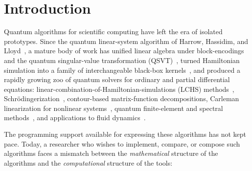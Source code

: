 \section{Introduction}
\label{sec:introduction}

Quantum algorithms for scientific computing have left the era of isolated
prototypes.  Since the quantum linear-system algorithm of Harrow, Hassidim,
and Lloyd~\cite{harrow2009hhl}, a mature body of work has unified linear
algebra under block-encodings and the quantum singular-value transformation
(QSVT)~\cite{gilyen2019qsvt,low2017qsp,martyn2021grand}, turned
Hamiltonian simulation into a family of interchangeable black-box
kernels~\cite{berry2015taylor,childs2021trotter,low2019qubitization}, and
produced a rapidly growing zoo of quantum solvers for ordinary and partial
differential equations: linear-combination-of-Hamiltonian-simulations (LCHS)
methods~\cite{an2026lchs}, Schr\"odingerization~\cite{jin2024schrodingerization},
contour-based matrix-function decompositions, Carleman
linearization for nonlinear systems~\cite{leyton2008ode,berry2014ode,liu2021pnas,liu2023carleman},
quantum finite-element and spectral
methods~\cite{montanaro2016fem,childs2020spectral}, and applications to fluid
dynamics~\cite{hu2024schrocircuits}.

The programming support available for expressing these algorithms has not kept
pace.  Today, a researcher who wishes to implement, compare, or compose such
algorithms faces a mismatch between the \emph{mathematical} structure of the
algorithms and the \emph{computational} structure of the tools:

